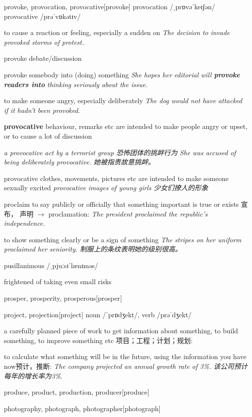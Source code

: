 \begin{DefWord}{provoke, provocation, provocative}[provoke]
    provocation /ˌprɒvəˈkeɪʃən/ provocative /prəˈvɒkətɪv/


    to cause a reaction or feeling, especially a sudden on
    \textit{The decision to invade provoked storms of protest.}

    provoke debate/discussion

    provoke somebody into (doing) something
    \textit{She hopes her editorial will \textbf{provoke readers into} thinking seriously about the issue.}

    to make someone angry, especially deliberately
    \textit{The dog would not have attacked if it hadn't been provoked.}

    \textbf{provocative}  behaviour, remarks etc are intended to make people angry or upset, or to cause a lot of discussion

    \textit{a provocative act by a terrorist group 恐怖团体的挑衅行为}
    \textit{She was accused of being deliberately provocative. 她被指责故意挑衅。 }

    provocative clothes, movements, pictures etc are intended to make someone sexually excited
    \textit{provocative images of young girls 少女们撩人的形象}
\end{DefWord}

\begin{DefWord}{proclaim}
    to say publicly or officially that something important is true or exists 宣布， 声明 $\rightarrow$ proclamation:
    \textit{The president proclaimed the republic's independence.}

    to show something clearly or be a sign of something
    \textit{The stripes on her uniform proclaimed her seniority. 制服上的条纹表明她的级别很高。 }

\end{DefWord}

\begin{DefWord}{pusillanimous}
    /ˌpjuːsɪˈlænɪməs/
    
    frightened of taking even small risks
\end{DefWord}

\begin{DefWord}{prosper, prosperity, prosperous}[prosper]
\end{DefWord}

\begin{DefWord}{project, projection}[project]
    noun  /ˈprɒdʒekt/, verb /prəˈdʒekt/
    
    a carefully planned piece of work to get information about something, to build something, to improve something etc 项目；工程；计划；规划:
    
    to calculate what something will be in the future, using the information you have now预计，推断:
     \textit{The company projected an annual growth rate of 3\%. 该公司预计每年的增长率为3\%}. 
    
 \end{DefWord}
    
 \begin{DefWord}{produce, product, production, producer}[produce]
 \end{DefWord}

 \begin{DefWord}{photography, photograph, photographer}[photograph]
 \end{DefWord}